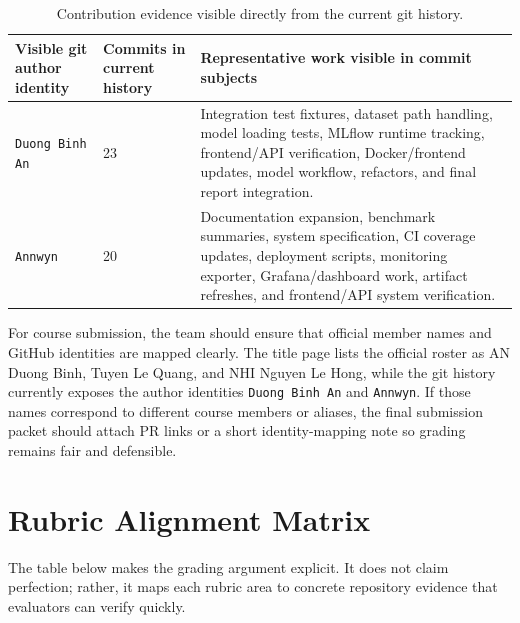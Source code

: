 \documentclass[11pt]{article}
\newcommand{\code}[1]{\texttt{#1}}
\begin{document}
\begin{table}[H]
\small
\centering
\begin{tabularx}{\textwidth}{p{}p{}X}
\toprule
Visible git author identity & Commits in current history & Representative work visible in commit subjects \\
\midrule
\code{Duong Binh An} & 23 & Integration test fixtures, dataset path handling, model loading tests, MLflow runtime tracking, frontend/API verification, Docker/frontend updates, model workflow, refactors, and final report integration. \\
\code{Annwyn} & 20 & Documentation expansion, benchmark summaries, system specification, CI coverage updates, deployment scripts, monitoring exporter, Grafana/dashboard work, artifact refreshes, and frontend/API system verification. \\
\bottomrule
\end{tabularx}
\caption{Contribution evidence visible directly from the current git history.}
\end{table}

For course submission, the team should ensure that official member names and GitHub identities are mapped clearly. The title page lists the official roster as AN Duong Binh, Tuyen Le Quang, and NHI Nguyen Le Hong, while the git history currently exposes the author identities \code{Duong Binh An} and \code{Annwyn}. If those names correspond to different course members or aliases, the final submission packet should attach PR links or a short identity-mapping note so grading remains fair and defensible.

\section{Rubric Alignment Matrix}
The table below makes the grading argument explicit. It does not claim perfection; rather, it maps each rubric area to concrete repository evidence that evaluators can verify quickly.
\end{document}

